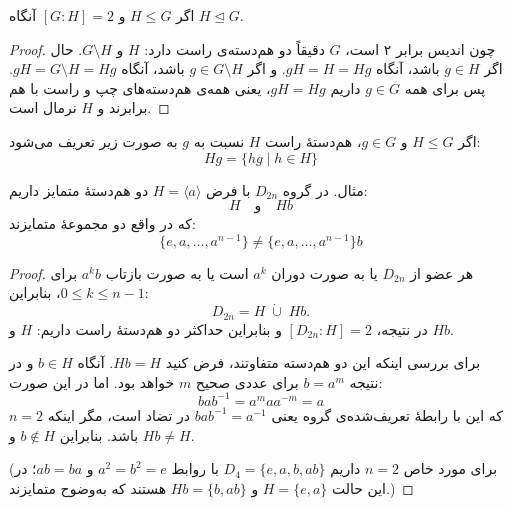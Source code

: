 \begin{frame}
    \begin{theorem}
        اگر \( H \leq G \) و \( [G : H] = 2 \) آنگاه \( H \trianglelefteq G \).
    \end{theorem}

    \begin{proof}
        چون اندیس برابر ۲ است، \( G \) دقیقاً دو هم‌دسته‌ی راست دارد: \( H \) و \( G \setminus H \).
        حال اگر \( g \in H \) باشد، آنگاه \( gH = H = Hg \).
        و اگر \( g \in G \setminus H \) باشد، آنگاه \( gH = G \setminus H = Hg \).
        پس برای همه \( g \in G \) داریم \( gH = Hg \)، یعنی همه‌ی هم‌دسته‌های چپ و راست با هم برابرند و \( H \) نرمال است.
    \end{proof}
\end{frame}

\begin{frame}
    \begin{definition}
        اگر \( H \leq G \) و \( g \in G \)، هم‌دستهٔ راست \( H \) نسبت به \( g \) به صورت زیر تعریف می‌شود:
        \[
            Hg = \{ hg \mid h \in H \}
        \]
    \end{definition}
\end{frame}


\begin{frame}

    \begin{example}
        مثال. در گروه $D_{2n}$ با فرض $H = \langle a \rangle$ دو هم‌دستهٔ متمایز داریم:
        \[
            H \quad \text{و} \quad Hb
        \]
        که در واقع دو مجموعهٔ متمایزند:
        \[
            \{e, a, \ldots, a^{n-1} \} \neq \{e, a, \ldots, a^{n-1} \}b
        \]
    \end{example}






\end{frame}
\begin{frame}
    \begin{proof}
        هر عضو از \(D_{2n}\) یا به صورت دوران \(a^k\) است یا به صورت بازتاب \(a^k b\) برای \(0\le k\le n-1\)، بنابراین:
        \[
            D_{2n}=H\;\dot\cup\;Hb.
        \]
        در نتیجه، \([D_{2n}:H]=2\) و بنابراین حداکثر دو هم‌دستهٔ راست داریم: \(H\) و \(Hb\).

        برای بررسی اینکه این دو هم‌دسته متفاوتند، فرض کنید \(Hb = H\). آنگاه \(b \in H\) و در نتیجه \(b = a^m\) برای عددی صحیح \(m\) خواهد بود. اما در این صورت:
        \[
            bab^{-1}=a^m a a^{-m}=a
        \]
        که این با رابطهٔ تعریف‌شده‌ی گروه یعنی \(bab^{-1} = a^{-1}\) در تضاد است، مگر اینکه \(n=2\) باشد. بنابراین \(b\notin H\) و \(Hb\ne H\).

        (برای مورد خاص \(n=2\) داریم \(D_4=\{e,a,b,ab\}\) با روابط \(a^2=b^2=e\) و \(ab=ba\)؛ در این حالت
        \(H=\{e,a\}\) و \(Hb=\{b,ab\}\) هستند که به‌وضوح متمایزند.)
    \end{proof}

\end{frame}

